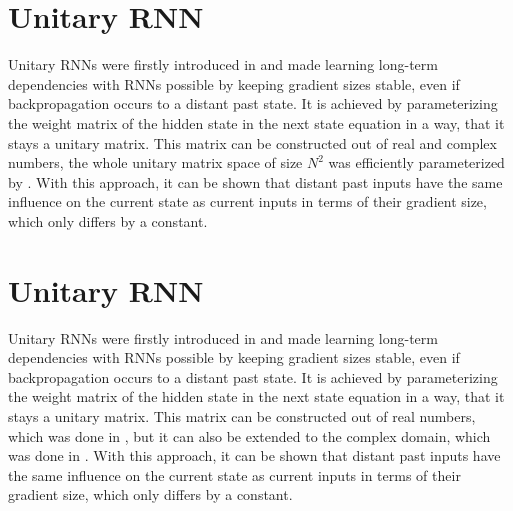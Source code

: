 \documentclass[draft,final]{vutinfth} %
\begin{document}
    \section{Unitary RNN} \label{Unitary RNN}
    Unitary RNNs were firstly introduced in \cite{UnitaryRNNs} and made learning long-term dependencies with RNNs possible by keeping gradient sizes stable, even if backpropagation occurs to a distant past state.
    It is achieved by parameterizing the weight matrix of the hidden state in the next state equation in a way, that it stays a unitary matrix.
    This matrix can be constructed out of real and complex numbers, the whole unitary matrix space of size $N^2$ was efficiently parameterized by \cite{EfficientUnitaryRNNs}.
    With this approach, it can be shown that distant past inputs have the same influence on the current state as current inputs in terms of their gradient size, which only differs by a constant.


    \section{Unitary RNN} \label{Unitary RNN}
    Unitary RNNs were firstly introduced in \cite{UnitaryRNNs} and made learning long-term dependencies with RNNs possible by keeping gradient sizes stable, even if backpropagation occurs to a distant past state.
    It is achieved by parameterizing the weight matrix of the hidden state in the next state equation in a way, that it stays a unitary matrix.
    This matrix can be constructed out of real numbers, which was done in \cite{UnitaryRNNs}, but it can also be extended to the complex domain, which was done in \cite{EfficientUnitaryRNNs}.
    With this approach, it can be shown that distant past inputs have the same influence on the current state as current inputs in terms of their gradient size, which only differs by a constant.
\end{document}
